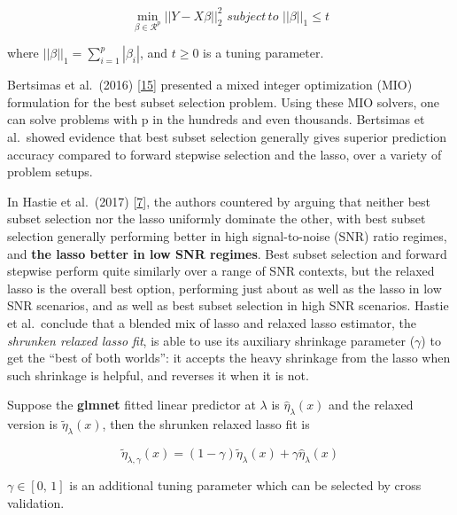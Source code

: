 \documentclass[
]{book}
\begin{document}
\begin{equation}

 \min_{\beta \in \mathcal{R}^p} ||Y - X\beta||^2_2 \, \, subject \, to \, \, ||\beta||_1 \leq t

 \label{eq:lasso}
\end{equation}

where \(||\beta||_1 = \sum_{i=1}^{p} |\beta_i|\), and \(t \geq 0\) is a tuning parameter.

Bertsimas et al.~(2016) {[}\protect\hyperlink{ref-Bertsimas:2016aa}{15}{]} presented a mixed integer optimization (MIO)
formulation for the best subset selection problem. Using these MIO solvers,
one can solve problems with p in the hundreds and even thousands.
Bertsimas et al.~showed evidence that
best subset selection generally gives superior prediction accuracy compared
to forward stepwise selection and the lasso, over a variety of problem setups.

In Hastie et al.~(2017) {[}\protect\hyperlink{ref-Hastie:2017aa}{7}{]}, the authors countered by arguing that
neither best subset selection nor the lasso uniformly dominate the other,
with best subset selection generally performing better in high signal-to-noise (SNR)
ratio regimes, and \textbf{the lasso better in low SNR regimes}.
Best subset selection and forward stepwise perform quite similarly over
a range of SNR contexts, but the relaxed lasso is the overall best option,
performing just about as well as the lasso in low SNR scenarios,
and as well as best subset selection in high SNR scenarios.
Hastie et al.~conclude that a blended mix of lasso and relaxed lasso estimator,
the \emph{shrunken relaxed lasso fit}, is able to use its auxiliary shrinkage
parameter (\(\gamma\)) to get the ``best of both worlds'':
it accepts the heavy shrinkage from the lasso when such shrinkage is helpful, and reverses it when it is not.

Suppose the \textbf{glmnet} fitted linear predictor at \(\lambda\) is \(\hat{\eta}_\lambda(x)\)
and the relaxed version is \(\tilde{\eta}_\lambda(x)\), then the shrunken relaxed lasso fit is

\begin{equation}

\tilde{\eta}_{\lambda,\gamma}(x)=(1-\gamma)\tilde{\eta}_\lambda(x) + \gamma \hat{\eta}_\lambda(x)

 \label{eq:blended}
\end{equation}

\(\gamma \in [0,\, 1]\) is an additional tuning parameter which can be selected by cross validation.
\end{document}
